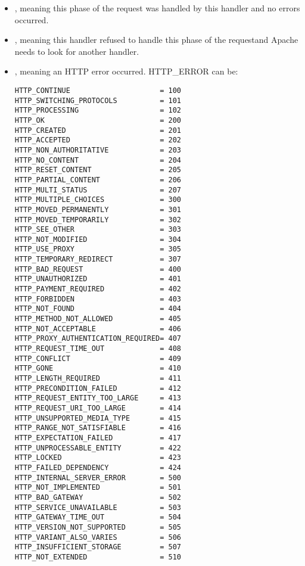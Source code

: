 \begin{itemize}

\item
{}, meaning this phase of the request was handled by this 
handler and no errors occurred. 

\item
{}, meaning this handler refused to handle this phase of 
the requestand Apache needs to look for another handler.
 
\item
{}, meaning an HTTP error occurred. HTTP_ERROR can be:

\begin{verbatim}
HTTP_CONTINUE                     = 100
HTTP_SWITCHING_PROTOCOLS          = 101
HTTP_PROCESSING                   = 102
HTTP_OK                           = 200
HTTP_CREATED                      = 201
HTTP_ACCEPTED                     = 202
HTTP_NON_AUTHORITATIVE            = 203
HTTP_NO_CONTENT                   = 204
HTTP_RESET_CONTENT                = 205
HTTP_PARTIAL_CONTENT              = 206
HTTP_MULTI_STATUS                 = 207
HTTP_MULTIPLE_CHOICES             = 300
HTTP_MOVED_PERMANENTLY            = 301
HTTP_MOVED_TEMPORARILY            = 302
HTTP_SEE_OTHER                    = 303
HTTP_NOT_MODIFIED                 = 304
HTTP_USE_PROXY                    = 305
HTTP_TEMPORARY_REDIRECT           = 307
HTTP_BAD_REQUEST                  = 400
HTTP_UNAUTHORIZED                 = 401
HTTP_PAYMENT_REQUIRED             = 402
HTTP_FORBIDDEN                    = 403
HTTP_NOT_FOUND                    = 404
HTTP_METHOD_NOT_ALLOWED           = 405
HTTP_NOT_ACCEPTABLE               = 406
HTTP_PROXY_AUTHENTICATION_REQUIRED= 407
HTTP_REQUEST_TIME_OUT             = 408
HTTP_CONFLICT                     = 409
HTTP_GONE                         = 410
HTTP_LENGTH_REQUIRED              = 411
HTTP_PRECONDITION_FAILED          = 412
HTTP_REQUEST_ENTITY_TOO_LARGE     = 413
HTTP_REQUEST_URI_TOO_LARGE        = 414
HTTP_UNSUPPORTED_MEDIA_TYPE       = 415
HTTP_RANGE_NOT_SATISFIABLE        = 416
HTTP_EXPECTATION_FAILED           = 417
HTTP_UNPROCESSABLE_ENTITY         = 422
HTTP_LOCKED                       = 423
HTTP_FAILED_DEPENDENCY            = 424
HTTP_INTERNAL_SERVER_ERROR        = 500
HTTP_NOT_IMPLEMENTED              = 501
HTTP_BAD_GATEWAY                  = 502
HTTP_SERVICE_UNAVAILABLE          = 503
HTTP_GATEWAY_TIME_OUT             = 504
HTTP_VERSION_NOT_SUPPORTED        = 505
HTTP_VARIANT_ALSO_VARIES          = 506
HTTP_INSUFFICIENT_STORAGE         = 507
HTTP_NOT_EXTENDED                 = 510
\end{verbatim}                      

\end{itemize}

